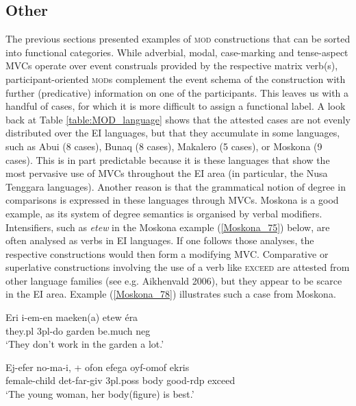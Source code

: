 \subsection{Other}

The previous sections presented examples of \textsc{mod} constructions that can be sorted into functional categories. While adverbial, modal, case-marking and tense-aspect MVCs operate over event construals provided by the respective matrix verb(s), participant-oriented \textsc{mod}s complement the event schema of the construction with further (predicative) information on one of the participants. This leaves us with a handful of cases, for which it is more difficult to assign a functional label. A look back at Table \ref{table:MOD_language} shows that the attested cases are not evenly distributed over the EI languages, but that they accumulate in some languages, such as Abui (8 cases), Bunaq (8 cases), Makalero (5 cases), or Moskona (9 cases). This is in part predictable because it is these languages that show the most pervasive use of MVCs throughout the EI area (in particular, the Nusa Tenggara languages). Another reason is that the grammatical notion of degree in comparisons is expressed in these languages through MVCs. Moskona is a good example, as its system of degree semantics is organised by verbal modifiers. Intensifiers, such as \textit{etew} in the Moskona example (\ref{Moskona_75}) below, are often analysed as verbs in EI languages. If one follows those analyses, the respective constructions would then form a modifying MVC. Comparative or superlative constructions involving the use of a verb like \textsc{exceed} are attested from other language families (see e.g. Aikhenvald 2006), but they appear to be scarce in the EI area. Example (\ref{Moskona_78}) illustrates such a case from Moskona.

\ea \label{Moskona_75}
\gll Eri i-em-en maeken(a) etew éra \\
they.\acs{pl} 3\acs{pl}-do garden be.much \acs{neg} \\
\glft `They don’t work in the garden a lot.’ \\ 
\z
\xe

\ea \label{Moskona_78}
\gll Ej-efer no-ma-i, + ofon efega oyf-omof ekris \\
female-child \acs{det}-far-\acs{giv} 3\acs{pl}.\acs{poss} body good-\acs{rdp} exceed \\
\glft `The young woman, her body(figure) is best.' \\ 
\z
\xe

